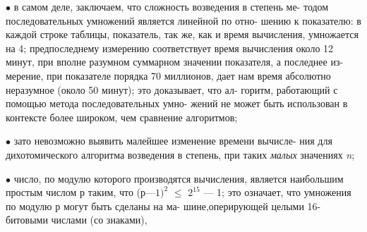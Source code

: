 $\bullet$ в самом деле, заключаем, что сложность возведения в степень ме­-\linebreak
\hspace*{24pt}тодом последовательных умножений является линейной по отно­-\linebreak
\hspace*{24pt}шению к показателю: в каждой строке таблицы, показатель, так\linebreak
\hspace*{24pt}же, как и время вычисления, умножается на 4; предпоследнему\linebreak
\hspace*{24pt}измерению соответствует время вычисления около 12 минут, при\linebreak
\hspace*{24pt}вполне разумном суммарном значении показателя, а последнее из­-\linebreak
\hspace*{24pt}мерение, при показателе порядка 70 миллионов, дает нам время\linebreak
\hspace*{24pt}абсолютно неразумное (около 50 минут); это доказывает, что ал­-\linebreak
\hspace*{24pt}горитм, работающий с помощью метода последовательных умно­-\linebreak
\hspace*{24pt}жений не может быть использован в контексте более широком,\linebreak
\hspace*{24pt}чем сравнение алгоритмов;

$\bullet$  зато невозможно выявить малейшее изменение времени вычисле­-\linebreak
\hspace*{24pt}ния для дихотомического алгоритма возведения в степень, при\linebreak
\hspace*{24pt}таких {\it малых} значениях {\it n};

$\bullet$ число, по модулю которого производятся вычисления, является\linebreak
\hspace*{24pt}наибольшим простым числом $р$ таким, что ($р—1)^2$ $\leqslant$ $2^{15}$ — 1; это\linebreak
\hspace*{24pt}означает, что умножения по модулю р могут быть сделаны на ма­-\linebreak
\hspace*{24pt}шине,оперирующей целыми 16-битовыми числами (со знаками),\linebreak

